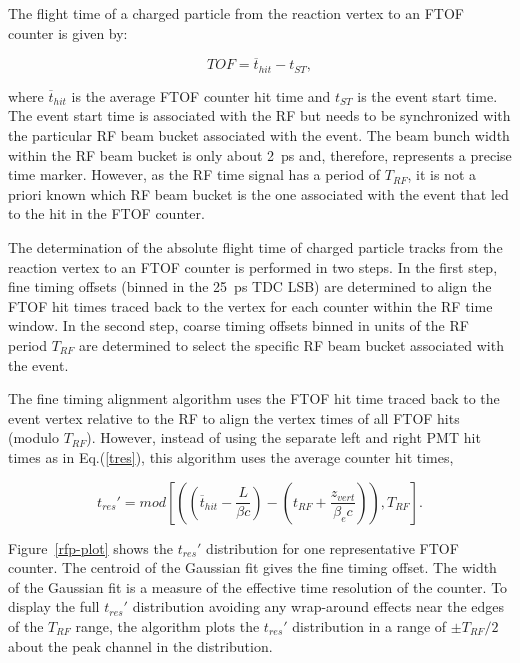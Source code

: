 \documentclass{elsart}
\begin{document}
The flight time of a charged particle from the reaction vertex to an FTOF counter is given by:

\begin{equation}
TOF = \overline{t}_{hit} - t_{ST},
\end{equation}

\noindent
where $\overline{t}_{hit}$ is the average FTOF counter hit time and $t_{ST}$ is the event start time.
The event start time is associated with the RF but needs to be synchronized with the particular RF
beam bucket associated with the event. The beam bunch width within the RF beam bucket is only
about 2~ps and, therefore, represents a precise time marker. However, as the RF time signal has a
period of $T_{RF}$, it is not a priori known which RF beam bucket is the one associated with the
event that led to the hit in the FTOF counter.

The determination of the absolute flight time of charged particle tracks from the reaction vertex
to an FTOF counter is performed in two steps. In the first step, fine timing offsets (binned in the
25~ps TDC LSB) are determined to align the FTOF hit times traced back to the vertex for each
counter within the RF time window. In the second step, coarse timing offsets binned in units of the
RF period $T_{RF}$ are determined to select the specific RF beam bucket associated with the event.

The fine timing alignment algorithm uses the FTOF hit time traced back to the event vertex relative
to the RF to align the vertex times of all FTOF hits (modulo $T_{RF}$). However, instead of using the
separate left and right PMT hit times as in Eq.(\ref{tres}), this algorithm uses the average counter
hit times, 

\begin{equation}
t_{res}' = mod \left[ \left( \left(\overline{t}_{hit} - \frac{L}{\beta c} \right) -
\left(t_{RF} + \frac{z_{vert}}{\beta_e c} \right) \right), T_{RF} \right].
\end{equation}

Figure~\ref{rfp-plot} shows the $t_{res}'$ distribution for one representative FTOF counter. The
centroid of the Gaussian fit gives the fine timing offset. The width of the Gaussian fit is a measure
of the effective time resolution of the counter. To display the full $t_{res}'$ distribution avoiding any
wrap-around effects near the edges of the $T_{RF}$ range, the algorithm plots the $t_{res}'$ distribution
in a range of $\pm T_{RF}/2$ about the peak channel in the distribution.
\end{document}
